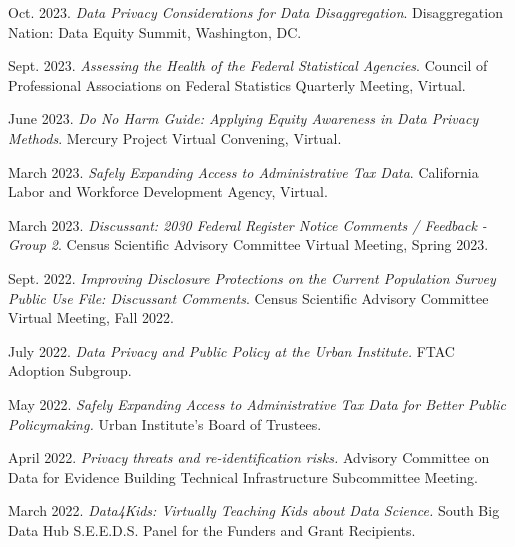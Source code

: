 \begin{etaremune}[topsep=0pt, itemsep=3pt, partopsep=0pt, parsep=0pt]

    \item Oct. 2023. \textit{Data Privacy Considerations for Data Disaggregation}. Disaggregation Nation: Data Equity Summit, Washington, DC.
    
    \item Sept. 2023. \textit{Assessing the Health of the Federal Statistical Agencies}. Council of Professional Associations on Federal Statistics Quarterly Meeting, Virtual.

    \item June 2023. \textit{Do No Harm Guide: Applying Equity Awareness in Data Privacy Methods}. Mercury Project Virtual Convening, Virtual.
    
    \item March 2023. \textit{Safely Expanding Access to Administrative Tax Data}. California Labor and Workforce Development Agency, Virtual.
    
    \item March 2023. \textit{Discussant: 2030 Federal Register Notice Comments / Feedback - Group 2}. Census Scientific Advisory Committee Virtual Meeting, Spring 2023.
    
    \item Sept. 2022. \textit{Improving Disclosure Protections on the Current Population Survey Public Use File: Discussant Comments}. Census Scientific Advisory Committee Virtual Meeting, Fall 2022.
    
    \item July 2022. \textit{Data Privacy and Public Policy at the Urban Institute.} FTAC Adoption Subgroup.
    
    \item May 2022. \textit{Safely Expanding Access to Administrative Tax Data for Better Public Policymaking.} Urban Institute's Board of Trustees.
    
    \item April 2022. \textit{Privacy threats and re-identification risks.} Advisory Committee on Data for Evidence Building Technical Infrastructure Subcommittee Meeting.
    
    \item March 2022. \textit{Data4Kids: Virtually Teaching Kids about Data Science.} South Big Data Hub S.E.E.D.S. Panel for the Funders and Grant Recipients.
    

\end{etaremune}
